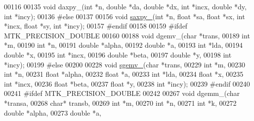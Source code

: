 \begin{DoxyCode}
00116 
00135 \textcolor{keywordtype}{void} daxpy\_(\textcolor{keywordtype}{int} *n, \textcolor{keywordtype}{double} *da, \textcolor{keywordtype}{double} *dx, \textcolor{keywordtype}{int} *incx, \textcolor{keywordtype}{double} *dy, \textcolor{keywordtype}{int} *incy);
00136 \textcolor{preprocessor}{#else}
00137 
00156 \textcolor{keywordtype}{void} \hyperlink{namespacemtk_a81a2d7d1ea9eff65ae13646c93dad5e9}{saxpy\_}(\textcolor{keywordtype}{int} *n, \textcolor{keywordtype}{float} *sa, \textcolor{keywordtype}{float} *sx, \textcolor{keywordtype}{int} *incx, \textcolor{keywordtype}{float} *sy, \textcolor{keywordtype}{int} *incy);
00157 \textcolor{preprocessor}{#endif}
00158 
00159 \textcolor{preprocessor}{#ifdef MTK\_PRECISION\_DOUBLE}
00160 
00188 \textcolor{keywordtype}{void} dgemv\_(\textcolor{keywordtype}{char} *trans,
00189             \textcolor{keywordtype}{int} *m,
00190             \textcolor{keywordtype}{int} *n,
00191             \textcolor{keywordtype}{double} *alpha,
00192             \textcolor{keywordtype}{double} *a,
00193             \textcolor{keywordtype}{int} *lda,
00194             \textcolor{keywordtype}{double} *x,
00195             \textcolor{keywordtype}{int} *incx,
00196             \textcolor{keywordtype}{double} *beta,
00197             \textcolor{keywordtype}{double} *y,
00198             \textcolor{keywordtype}{int} *incy);
00199 \textcolor{preprocessor}{#else}
00200 
00228 \textcolor{keywordtype}{void} \hyperlink{namespacemtk_a88daff7ad6f251a58b94aa2d0c94d069}{sgemv\_}(\textcolor{keywordtype}{char} *trans,
00229             \textcolor{keywordtype}{int} *m,
00230             \textcolor{keywordtype}{int} *n,
00231             \textcolor{keywordtype}{float} *alpha,
00232             \textcolor{keywordtype}{float} *a,
00233             \textcolor{keywordtype}{int} *lda,
00234             \textcolor{keywordtype}{float} *x,
00235             \textcolor{keywordtype}{int} *incx,
00236             \textcolor{keywordtype}{float} *beta,
00237             \textcolor{keywordtype}{float} *y,
00238             \textcolor{keywordtype}{int} *incy);
00239 \textcolor{preprocessor}{#endif}
00240 
00241 \textcolor{preprocessor}{#ifdef MTK\_PRECISION\_DOUBLE}
00242 
00267 \textcolor{keywordtype}{void} dgemm\_(\textcolor{keywordtype}{char} *transa,
00268             \textcolor{keywordtype}{char}* transb,
00269             \textcolor{keywordtype}{int} *m,
00270             \textcolor{keywordtype}{int} *n,
00271             \textcolor{keywordtype}{int} *k,
00272             \textcolor{keywordtype}{double} *alpha,
00273             \textcolor{keywordtype}{double} *a,

\end{DoxyCode}
